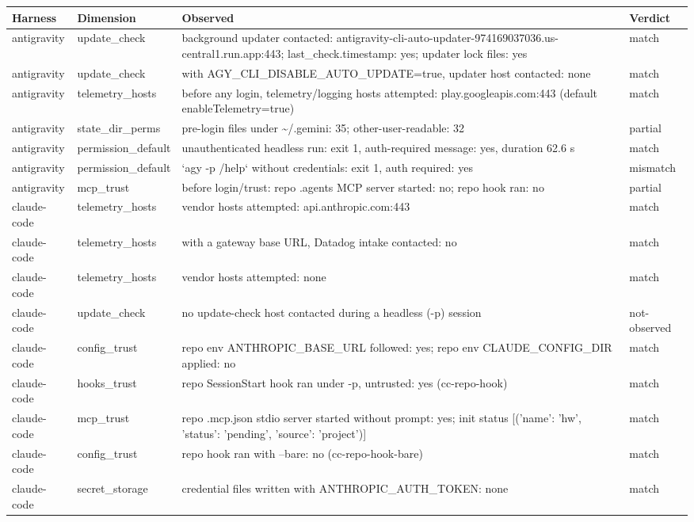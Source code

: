 \begin{tabular}{p{1.9cm}p{2.3cm}p{10.4cm}p{1.6cm}}
\toprule
Harness & Dimension & Observed & Verdict \\
\midrule
antigravity & update\_check & background updater contacted: antigravity-cli-auto-updater-974169037036.us-central1.run.app:443; last\_check.timestamp: yes; updater lock files: yes & match \\
antigravity & update\_check & with AGY\_CLI\_DISABLE\_AUTO\_UPDATE=true, updater host contacted: none & match \\
antigravity & telemetry\_hosts & before any login, telemetry/logging hosts attempted: play.googleapis.com:443 (default enableTelemetry=true) & match \\
antigravity & state\_dir\_perms & pre-login files under \textasciitilde{}/.gemini: 35; other-user-readable: 32 & partial \\
antigravity & permission\_default & unauthenticated headless run: exit 1, auth-required message: yes, duration 62.6 s & match \\
antigravity & permission\_default & `agy -p /help` without credentials: exit 1, auth required: yes & mismatch \\
antigravity & mcp\_trust & before login/trust: repo .agents MCP server started: no; repo hook ran: no & partial \\
claude-code & telemetry\_hosts & vendor hosts attempted: api.anthropic.com:443 & match \\
claude-code & telemetry\_hosts & with a gateway base URL, Datadog intake contacted: no & match \\
claude-code & telemetry\_hosts & vendor hosts attempted: none & match \\
claude-code & update\_check & no update-check host contacted during a headless (-p) session & not-observed \\
claude-code & config\_trust & repo env ANTHROPIC\_BASE\_URL followed: yes; repo env CLAUDE\_CONFIG\_DIR applied: no & match \\
claude-code & hooks\_trust & repo SessionStart hook ran under -p, untrusted: yes (cc-repo-hook) & match \\
claude-code & mcp\_trust & repo .mcp.json stdio server started without prompt: yes; init status [('name': 'hw', 'status': 'pending', 'source': 'project')] & match \\
claude-code & config\_trust & repo hook ran with --bare: no (cc-repo-hook-bare) & match \\
claude-code & secret\_storage & credential files written with ANTHROPIC\_AUTH\_TOKEN: none & match \\

\end{tabular}
